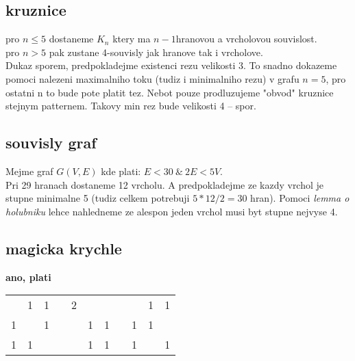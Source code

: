 \documentclass[a4paper]{article}
\begin{document}
\subsection{kruznice}
pro $n \leq 5$ dostaneme $K_n$ ktery ma $n-1$hranovou a vrcholovou souvislost.\\
pro $n > 5$ pak zustane 4-souvisly jak hranove tak i vrcholove.\\ 
Dukaz sporem, predpokladejme existenci rezu velikosti 3.
To snadno dokazeme pomoci nalezeni maximalniho toku
(tudiz i minimalniho rezu) v grafu $n=5$, pro ostatni n to bude pote platit tez.
Nebot pouze prodluzujeme "obvod" kruznice stejnym patternem. Takovy
min rez bude velikosti 4 -- spor.


\subsection{souvisly graf}
Mejme graf $G(V,E)$ kde plati: $E<30~\&~2E < 5V$.\\
Pri 29 hranach dostaneme 12 vrcholu. A predpokladejme ze kazdy
vrchol je stupne minimalne 5 (tudiz celkem potrebuji $5*12/2=30$ hran).
Pomoci \textit{lemma o holubniku} lehce nahledneme ze
alespon jeden vrchol musi byt stupne nejvyse 4.


\subsection{magicka krychle}
\textbf{ano, plati}\\
\begin{tabular}{|c|l|l|l|l|l|l|l|l|l|l|}
    \cline{1-3} \cline{5-7} \cline{9-11}
      & 1 & 1 &  & 2 &   &   &  &   & 1 & 1 \\ \cline{1-3} \cline{5-7} \cline{9-11} 
    1 &   & 1 &  &   & 1 & 1 &  & 1 & 1 &   \\ \cline{1-3} \cline{5-7} \cline{9-11} 
    1 & 1 &   &  &   & 1 & 1 &  & 1 &   & 1 \\ \cline{1-3} \cline{5-7} \cline{9-11} 
\end{tabular}
\end{document}
